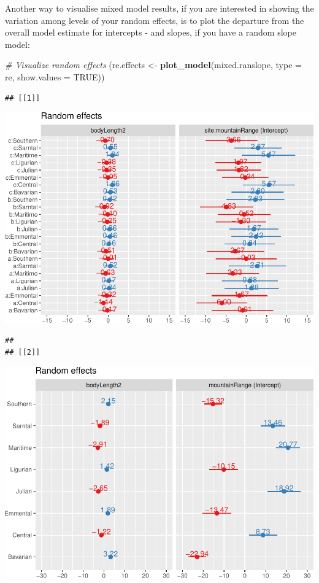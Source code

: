 \documentclass[
]{article}
\newenvironment{Shaded}{\begin{snugshade}}{\end{snugshade}}
\newcommand{\AttributeTok}[1]{\textcolor[rgb]{0.13,0.29,0.53}{#1}}
\newcommand{\CommentTok}[1]{\textcolor[rgb]{0.56,0.35,0.01}{\textit{#1}}}
\newcommand{\ConstantTok}[1]{\textcolor[rgb]{0.56,0.35,0.01}{#1}}
\newcommand{\FunctionTok}[1]{\textcolor[rgb]{0.13,0.29,0.53}{\textbf{#1}}}
\newcommand{\NormalTok}[1]{#1}
\newcommand{\OtherTok}[1]{\textcolor[rgb]{0.56,0.35,0.01}{#1}}
\newcommand{\StringTok}[1]{\textcolor[rgb]{0.31,0.60,0.02}{#1}}
\begin{document}
Another way to visualise mixed model results, if you are interested in
showing the variation among levels of your random effects, is to plot
the departure from the overall model estimate for intercepts - and
slopes, if you have a random slope model:

\begin{Shaded}
\begin{Highlighting}[]
\CommentTok{\# Visualize random effects}
\NormalTok{(re.effects }\OtherTok{\textless{}{-}} \FunctionTok{plot\_model}\NormalTok{(mixed.ranslope, }\AttributeTok{type =} \StringTok{\textquotesingle{}re\textquotesingle{}}\NormalTok{, }\AttributeTok{show.values =} \ConstantTok{TRUE}\NormalTok{))}
\end{Highlighting}
\end{Shaded}

\begin{verbatim}
## [[1]]
\end{verbatim}

\includegraphics{Introduction-to-linear-mixed-models_files/figure-latex/unnamed-chunk-27-1.pdf}

\begin{verbatim}
## 
## [[2]]
\end{verbatim}

\includegraphics{Introduction-to-linear-mixed-models_files/figure-latex/unnamed-chunk-27-2.pdf}
\end{document}
